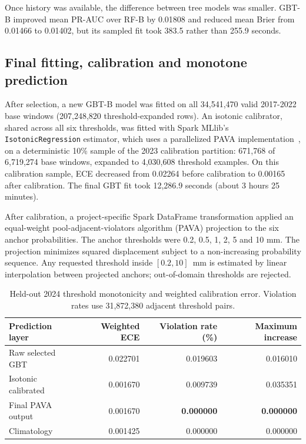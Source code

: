 \documentclass[11pt,a4paper]{article}
\begin{document}
Once history was available, the difference between tree models was smaller.
GBT-B improved mean PR-AUC over RF-B by 0.01808 and reduced mean Brier from
0.01466 to 0.01402, but its sampled fit took 383.5 rather than 255.9 seconds.

\subsection{Final fitting, calibration and monotone prediction}
After selection, a new GBT-B model was fitted on all 34,541,470 valid
2017-2022 base windows (207,248,820 threshold-expanded rows). An isotonic
calibrator, shared across all six thresholds, was fitted with Spark MLlib's
\texttt{IsotonicRegression} estimator, which uses a parallelized PAVA
implementation~\cite{spark-isotonic}, on a deterministic 10\% sample of the
2023 calibration partition: 671,768 of 6,719,274 base windows, expanded to
4,030,608 threshold examples.
On this calibration sample, ECE decreased from 0.02264 before calibration to
0.00165 after calibration. The final GBT fit took
12,286.9 seconds (about 3 hours 25 minutes).

After calibration, a project-specific Spark DataFrame transformation applied
an equal-weight pool-adjacent-violators algorithm (PAVA) projection to the six
anchor probabilities. The anchor thresholds were 0.2, 0.5, 1, 2, 5 and 10 mm.
The projection minimizes squared displacement subject to a non-increasing
probability sequence. Any requested threshold inside
$[0.2,10]$~mm is estimated by linear interpolation between projected anchors;
out-of-domain thresholds are rejected.

\begin{table}[htbp]
\centering\small
\caption{Held-out 2024 threshold monotonicity and weighted calibration error.
Violation rates use 31,872,380 adjacent threshold pairs.}
\label{tab:monotonicity}
\begin{tabular}{l r r r}
\toprule
Prediction layer & Weighted ECE & Violation rate (\%) & Maximum increase \\
\midrule
Raw selected GBT & 0.022701 & 0.019603 & 0.016010 \\
Isotonic calibrated & 0.001670 & 0.009739 & 0.035351 \\
Final PAVA output & 0.001670 & \textbf{0.000000} & \textbf{0.000000} \\
Climatology & 0.001425 & 0.000000 & 0.000000 \\
\bottomrule
\end{tabular}
\end{table}
\end{document}
